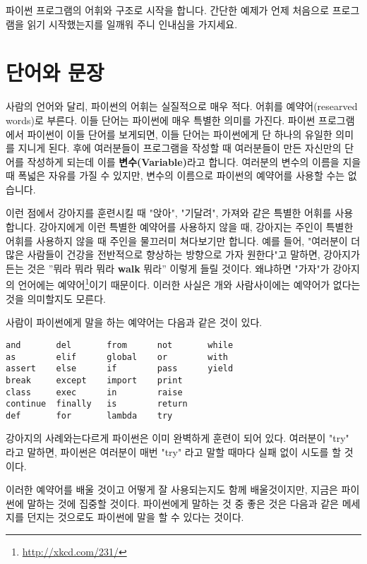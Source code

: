 파이썬 프로그램의 어휘와 구조로 시작을 합니다. 간단한 예제가 언제 처음으로 프로그램을 읽기 시작했는지를 일깨워 주니 인내심을 가지세요.

\section{단어와 문장}

사람의 언어와 달리, 파이썬의 어휘는 실질적으로 매우 적다. 어휘를 예약어(researved words)로 부른다. 이들 단어는 파이썬에 매우 특별한 의미를 가진다. 파이썬 프로그램에서 파이썬이 이들 단어를 보게되면, 이들 단어는 파이썬에게 단 하나의 유일한 의미를 지니게 된다. 후에 여러분들이 프로그램을 작성할 때 여러분들이 만든 자신만의 단어를 작성하게 되는데 이를 {\bf 변수(Variable)}라고 합니다. 여러분의 변수의 이름을 지을 때 폭넓은 자유를 가질 수 있지만, 변수의 이름으로 파이썬의 예약어를 사용할 수는 없습니다.

이런 점에서 강아지를 훈련시킬 때 "앉아", "기달려", 가져와 같은 특별한 어휘를 사용합니다. 강아지에게 이런 특별한 예약어를 사용하지 않을 때, 강아지는 주인이 특별한 어휘를 사용하지 않을 때 주인을 물끄러미 쳐다보기만 합니다. 예를 들어, "여러분이 더 많은 사람들이 건강을 전반적으로 향상하는 방향으로 가자 원한다"고 말하면, 강아지가 든는 것은 ''뭐라 뭐라 뭐라 {\bf walk} 뭐라'' 이렇게 들릴 것이다. 왜냐하면 "가자"가 강아지의 언어에는 예약어\footnote{\url{http://xkcd.com/231/}}이기 때문이다. 이러한 사실은 개와 사람사이에는 예약어가 없다는 것을 의미할지도 모른다.

사람이 파이썬에게 말을 하는 예약어는 다음과 같은 것이 있다.

\beforeverb
\begin{verbatim}
and       del       from      not       while    
as        elif      global    or        with     
assert    else      if        pass      yield    
break     except    import    print              
class     exec      in        raise              
continue  finally   is        return             
def       for       lambda    try
\end{verbatim}
\afterverb
%
강아지의 사례와는다르게 파이썬은 이미 완벽하게 훈련이 되어 있다. 여러분이 "try" 라고 말하면, 파이썬은 여러분이 매번 "try" 라고 말할 때마다 실패 없이 시도를 할 것이다.

이러한 예약어를 배울 것이고 어떻게 잘 사용되는지도 함께 배울것이지만, 지금은 파이썬에 말하는 것에 집중할 것이다. 파이썬에게 말하는 것 중 좋은 것은 다음과 같은 메세지를 던지는 것으로도 파이썬에 말을 할 수 있다는 것이다.

